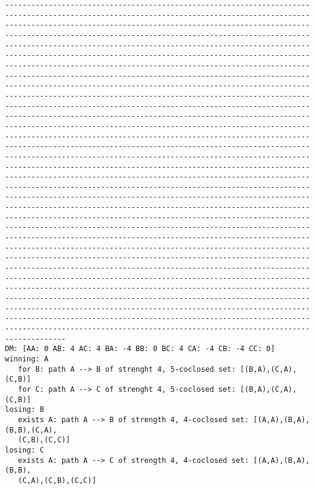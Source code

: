 \documentclass{llncs}
\begin{document}
\begin{verbatim}
--------------------------------------------------------------------------------------------------------------------------------------------------------------------------------------------------------------------------------------------------------------------------------------------------------------------------------------------------------------------------------------------------------------------------------------------------------------------------------------------------------------------------------------------------------------------------------------------------------------------------------------------------------------------------------------------------------------------------------------------------------------------------------------------------------------------------------------------------------------------------------------------------------------------------------------------------------------------------------------------------------------------------------------------------------------------------------------------------------------------------------------------------------------------------------------------------------------------------------------------------------------------------------------------------------------------------------------------------------------------------------------------------------------------------------------------------------------------------------------------------------------------------------------------------------------------------------------------------------------------------------------------------------------------------------------------------------------------------------------------------------------------------------------------------------------------------------------------------------------------------------------------------------------------------------------------------------------------------------------------------------------------------------------------------------------------------------------------------------------------------------------------------------------------------------------------------------------------------------------------------------------------------------------------------------------------------------------------------------------------------------------------------------------------
DM: [AA: 0 AB: 4 AC: 4 BA: -4 BB: 0 BC: 4 CA: -4 CB: -4 CC: 0]
winning: A
   for B: path A --> B of strenght 4, 5-coclosed set: [(B,A),(C,A),(C,B)]
   for C: path A --> C of strenght 4, 5-coclosed set: [(B,A),(C,A),(C,B)] 
losing: B
   exists A: path A --> B of strength 4, 4-coclosed set: [(A,A),(B,A),(B,B),(C,A),
   (C,B),(C,C)]
losing: C
   exists A: path A --> C of strength 4, 4-coclosed set: [(A,A),(B,A),(B,B),
   (C,A),(C,B),(C,C)]

\end{verbatim}
\end{document}
